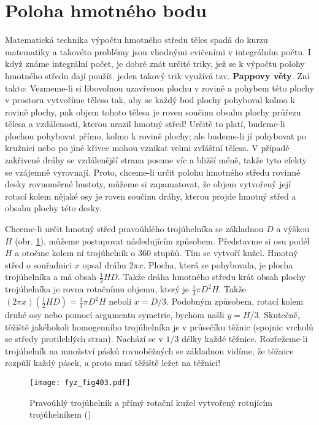   \section{Poloha hmotného bodu}\label{fyz:IchapXIXsecII}
    Matematická technika výpočtu hmotného středu těles spadá do kurzu matematiky a takovéto problémy
    jsou vhodnými cvičeními v integrálním počtu. I když známe integrální počet, je dobré znát určité
    triky, jež se k výpočtu polohy hmotného středu dají použít. jeden takový trik využívá tzv.
    \textbf{Pappovy věty}. Zní takto: Vezmeme-li si libovolnou uzavřenou plochu v rovině a pohybem
    této plochy v prostoru vytvoříme těleso tak, aby se každý bod plochy pohyboval kolmo k rovině
    plochy, pak objem tohoto tělesa je roven součinu obsahu plochy průřezu tělesa a vzdáleností,
    kterou urazil hmotný střed! Určitě to platí, budeme-li plochou pohybovat přímo, kolmo k rovině
    plochy; ale budeme-li jí pohybovat po kružnici nebo po jiné křivce mohou vznikat velmi zvláštní
    tělesa. V případě zakřivené dráhy se vzdálenější strana posune víc a bližší méně, takže tyto
    efekty se vzájemně vyrovnají. Proto, chceme-li určit polohu hmotného středu rovinné desky
    rovnoměrné hustoty, můžeme si zapamatovat, že objem vytvořený její rotací kolem nějaké osy je
    roven součinu dráhy, kterou projde hmotný střed a obsahu plochy této desky.

    Chceme-li určit hmotný střed pravoúhlého trojúhelníka se základnou \(D\) a výškou \(H\) (obr.
    \ref{fyz:fig403}), můžeme postupovat následujícím způsobem. Představme si osu podél \(H\) a
    otočme kolem ní trojúhelník o \num{360} stupňů. Tím se vytvoří kužel. Hmotný střed o souřadnici
    \(x\) opsal dráhu \(2\pi x\). Plocha, která se pohybovala, je plocha trojúhelníka a má obsah
    \(\frac{1}{2}HD\). Takže dráha hmotného středu krát obsah plochy trojúhelníka je rovna rotačnímu
    objemu, který je \(\frac{1}{3}\pi D^2H\). Takže \((2\pi x) (\frac{1}{2}HD) =\frac{1}{3}\pi
    D^2H\) neboli \(x=D/3\). Podobným způsobem, rotací kolem druhé osy nebo pomocí argumentu
    symetrie, bychom našli \(y=H/3\). Skutečně, těžiště jakéhokoli homogenního trojúhelníka je v
    průsečíku těžnic (spojnic vrcholů se středy protilehlých stran). Nachází se v \(1/3\) délky
    každé těžnice. Rozřežeme-li trojúhelník na množství pásků rovnoběžných se základnou vidíme, že
    těžnice rozpůlí každý pásek, a proto musí těžiště ležet na těžnici!  

    \begin{figure}[ht!] %
      \centering
      \texttt{[image: fyz\_fig403.pdf]}
      \caption{Pravoúhlý trojúhelník a přímý rotační kužel vytvořený rotujícím trojúhelníkem 
              (\cite[s.~263]{Feynman01})}
      \label{fyz:fig403}
    \end{figure}

